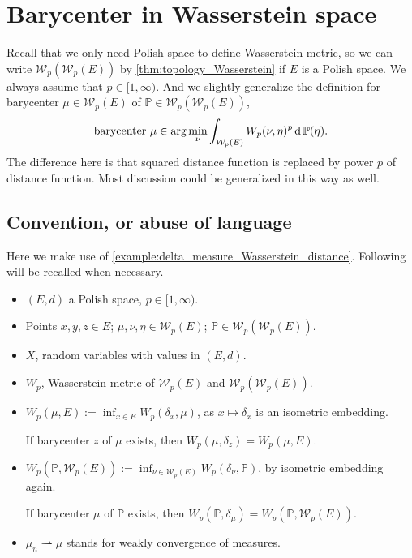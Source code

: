 \section{Barycenter in Wasserstein space}

Recall that we only need Polish space to define Wasserstein metric, so we can write $\mathcal{W}_p(\mathcal{W}_p(E))$
by \cref{thm:topology_Wasserstein} if $E$ is a Polish space.
We always assume that $p \in [1, \infty)$.
And we slightly generalize the definition for barycenter $\mu \in \mathcal{W}_p(E)$
of $\mathbb{P} \in \mathcal{W}_p(\mathcal{W}_p(E))$,
\[
	\text{barycenter } \mu \in \arg \min_{\nu} \int_{\mathcal{W}_p(E)} W_p(\nu, \eta)^p \operatorname{d} \mathbb{P} (\eta).
\]
The difference here is that squared distance function is replaced by power $p$ of distance function.
Most discussion could be generalized in this way as well.

\subsection{Convention, or abuse of language}

\label{subsection:convention}
Here we make use of \cref{example:delta_measure_Wasserstein_distance}.
Following will be recalled when necessary.

\begin{itemize}
	\item $(E,d)$ a Polish space, $p \in [1, \infty)$.
	\item Points $x,y,z \in E$; $\mu, \nu, \eta \in \mathcal{W}_p(E)$; $\mathbb{P} \in \mathcal{W}_p(\mathcal{W}_p(E))$.
	\item $X$, random variables with values in $(E, d)$.
	\item $W_p$, Wasserstein metric of $\mathcal{W}_p(E)$ and $\mathcal{W}_p(\mathcal{W}_p(E))$.
	\item $W_p(\mu, E):= \inf_{x \in E}W_p(\delta_x, \mu)$,
	      as $x \mapsto \delta_x$ is an isometric embedding.

	      If barycenter $z$ of $\mu$ exists, then $W_p(\mu, \delta_z)=W_p(\mu, E)$.
	\item $W_p(\mathbb{P}, \mathcal{W}_p(E)) := \inf_{\nu \in \mathcal{W}_p(E)} W_p(\delta_\nu, \mathbb{P})$, by isometric embedding again.

	      If barycenter $\mu$ of $\mathbb{P}$ exists, then $W_p(\mathbb{P}, \delta_\mu)=W_p(\mathbb{P}, \mathcal{W}_p(E))$.
	\item $\mu_n \rightharpoonup \mu$ stands for weakly convergence of measures.

\end{itemize}


